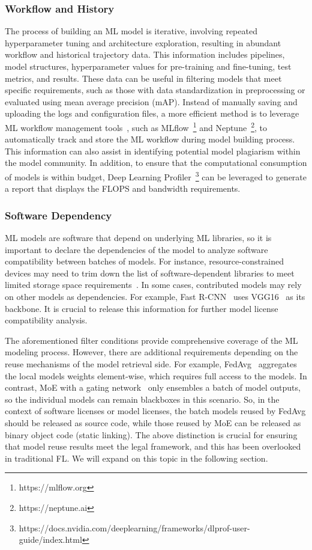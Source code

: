 \subsubsection{Workflow and History}
\label{sec:workflow&history}
The process of building an ML model is iterative, involving repeated hyperparameter tuning and architecture exploration, resulting in abundant workflow and historical trajectory data.
This information includes pipelines, model structures, hyperparameter values for pre-training and fine-tuning, test metrics, and results. 
These data can be useful in filtering models that meet specific requirements, such as those with data standardization in preprocessing or evaluated using mean average precision (mAP).
Instead of manually saving and uploading the logs and configuration files, a more efficient method is to leverage ML workflow management tools~\cite{vartak2016modeldb}, such as MLflow~\footnote{https://mlflow.org} and Neptune~\footnote{https://neptune.ai}, to automatically track and store the ML workflow during model building process. 
This information can also assist in identifying potential model plagiarism within the model community.
In addition, to ensure that the computational consumption of models is within budget, Deep Learning Profiler~\footnote{https://docs.nvidia.com/deeplearning/frameworks/dlprof-user-guide/index.html} can be leveraged to generate a report that displays the FLOPS and bandwidth requirements.

\subsubsection{Software Dependency}
ML models are software that depend on underlying ML libraries, so it is important to declare the dependencies of the model to analyze software compatibility between batches of models. 
For instance, resource-constrained devices may need to trim down the list of software-dependent libraries to meet limited storage space requirements~\cite{david2021tensorflow}.
In some cases, contributed models may rely on other models as dependencies. 
For example, Fast R-CNN~\cite{girshick2015fast} uses VGG16~\cite{simonyan2014very} as its backbone. 
It is crucial to release this information for further model license compatibility analysis.

The aforementioned filter conditions provide comprehensive coverage of the ML modeling process. 
However, there are additional requirements depending on the reuse mechanisms of the model retrieval side. 
For example, FedAvg~\cite{mcmahan2017communication} aggregates the local models weights element-wise, which requires full access to the models. 
In contrast, MoE with a gating network~\cite{jacobs1991adaptive} only ensembles a batch of model outputs, so the individual models can remain blackboxes in this scenario.
So, in the context of software licenses or model licenses, the batch models reused by FedAvg should be released as source code, while those reused by MoE can be released as binary object code (static linking).
The above distinction is crucial for ensuring that model reuse results meet the legal framework, and this has been overlooked in traditional FL.
We will expand on this topic in the following section.

